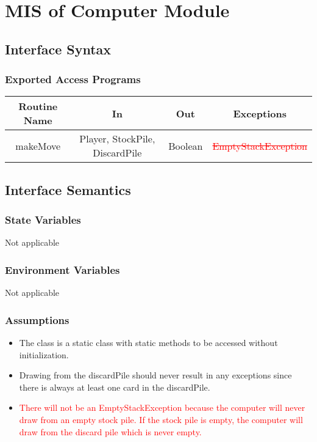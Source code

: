 \documentclass[12pt, titlepage]{article}
\begin{document}
\section{MIS of Computer Module}
\subsection{Interface Syntax}
\subsubsection{Exported Access Programs}

\begin{tabular}[pos]{| c | c | c | c |}
    \hline
    \textbf{Routine Name} & \textbf{In} & \textbf{Out} & \textbf{Exceptions}\\
    \hline
    makeMove & Player, StockPile, DiscardPile & Boolean & \textcolor{red}{\sout{EmptyStackException}}\\
    \hline
\end{tabular}

\subsection{Interface Semantics}
\subsubsection{State Variables}
Not applicable

\subsubsection{Environment Variables}
Not applicable

\subsubsection{Assumptions}
\begin{itemize}
    \item The class is a static class with static methods to be accessed without initialization.
    \item Drawing from the discardPile should never result in any exceptions since there is always at least one card in the discardPile.
    \item \textcolor{red}{There will not be an EmptyStackException because the computer will never draw from an empty stock pile. If the stock pile is empty, the computer will draw from the discard pile which is never empty.}
\end{itemize}
\end{document}
